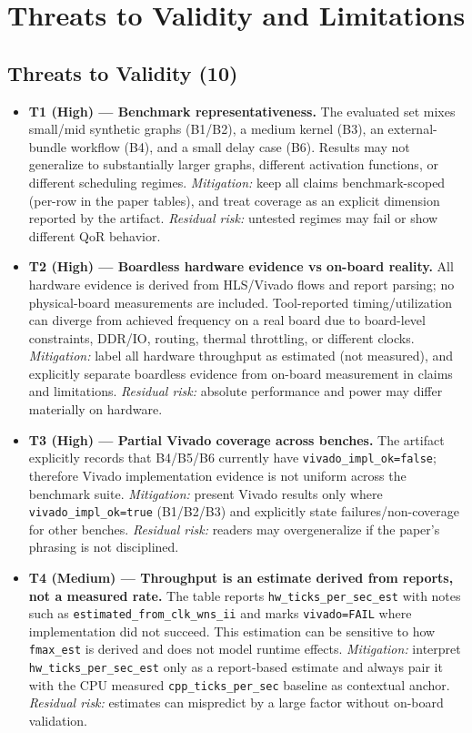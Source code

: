 \section{Threats to Validity and Limitations}

\subsection{Threats to Validity (10)}

\begin{itemize}
\item \textbf{T1 (High) --- Benchmark representativeness.} The evaluated set mixes small/mid synthetic graphs (B1/B2), a medium kernel (B3), an external-bundle workflow (B4), and a small delay case (B6). Results may not generalize to substantially larger graphs, different activation functions, or different scheduling regimes. \textit{Mitigation:} keep all claims benchmark-scoped (per-row in the paper tables), and treat coverage as an explicit dimension reported by the artifact. \textit{Residual risk:} untested regimes may fail or show different QoR behavior.

\item \textbf{T2 (High) --- Boardless hardware evidence vs on-board reality.} All hardware evidence is derived from HLS/Vivado flows and report parsing; no physical-board measurements are included. Tool-reported timing/utilization can diverge from achieved frequency on a real board due to board-level constraints, DDR/IO, routing, thermal throttling, or different clocks. \textit{Mitigation:} label all hardware throughput as estimated (not measured), and explicitly separate boardless evidence from on-board measurement in claims and limitations. \textit{Residual risk:} absolute performance and power may differ materially on hardware.

\item \textbf{T3 (High) --- Partial Vivado coverage across benches.} The artifact explicitly records that B4/B5/B6 currently have \texttt{vivado\_impl\_ok=false}; therefore Vivado implementation evidence is not uniform across the benchmark suite. \textit{Mitigation:} present Vivado results only where \texttt{vivado\_impl\_ok=true} (B1/B2/B3) and explicitly state failures/non-coverage for other benches. \textit{Residual risk:} readers may overgeneralize if the paper's phrasing is not disciplined.

\item \textbf{T4 (Medium) --- Throughput is an estimate derived from reports, not a measured rate.} The table reports \texttt{hw\_ticks\_per\_sec\_est} with notes such as \texttt{estimated\_from\_clk\_wns\_ii} and marks \texttt{vivado=FAIL} where implementation did not succeed. This estimation can be sensitive to how \texttt{fmax\_est} is derived and does not model runtime effects. \textit{Mitigation:} interpret \texttt{hw\_ticks\_per\_sec\_est} only as a report-based estimate and always pair it with the CPU measured \texttt{cpp\_ticks\_per\_sec} baseline as contextual anchor. \textit{Residual risk:} estimates can mispredict by a large factor without on-board validation.


\end{itemize}
